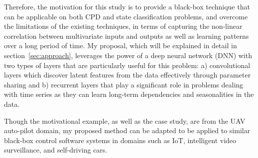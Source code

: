 Therefore, the motivation for this study is to provide a black-box technique that can be applicable on both CPD and state classification problems, and overcome the limitations of the existing techniques, in terms of capturing the non-linear correlation between multivariate inputs and outputs as well as learning patterns over a long period of time. My proposal, which will be explained in detail in section~\ref{sec:approach}, leverages the power of a deep neural network (DNN) with two types of layers that are particularly useful for this problem: a) convolutional layers which discover latent features from the data effectively through parameter sharing and b) recurrent layers that play a significant role in problems dealing with time series as they can learn long-term dependencies and seasonalities in the data. 

Though the motivational example, as well as the case study, are from the UAV auto-pilot domain, my proposed method can be adapted to be applied to similar black-box control software systems in domains such as IoT, intelligent video surveillance, and self-driving cars.